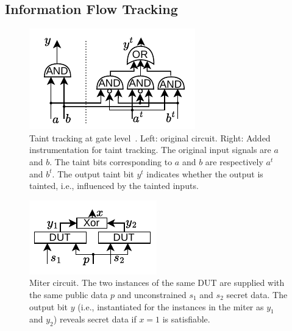 \subsection{Information Flow Tracking}
\label{subsec:ift}

\begin{figure}[t]
    \begin{center}
    \includegraphics[width=0.5\columnwidth]{figures/glift/glift.pdf}
    \end{center}
    \vspace*{-1em}
    \caption{\label{fig:glift} Taint tracking at gate level~\cite{tiwari2009complete}. Left: original circuit. Right: Added instrumentation for taint tracking. The original input signals are $a$ and $b$. The taint bits corresponding to $a$ and $b$ are respectively $a^t$ and $b^t$. The output taint bit $y^t$ indicates whether the output is tainted, i.e., influenced by the tainted inputs.}
    \vspace*{-1em}
\end{figure}

\begin{figure}[t]
    \begin{center}
    \includegraphics[width=0.5\columnwidth]{figures/miter/miter.pdf}
    \end{center}
    \vspace*{-2em}
    \caption{\label{fig:miter} Miter circuit. The two instances of the same DUT are supplied with the same public data $p$ and unconstrained $s_1$ and $s_2$ secret data. The output bit $y$ (i.e., instantiated for the instances in the miter as $y_1$ and $y_2$) reveals secret data if $x=1$ is satisfiable.}
\end{figure}

